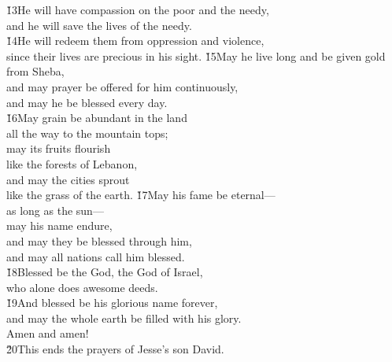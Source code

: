 \begin{poetry}
\poeml \v{13}He will have compassion on the poor and the needy, \\
\poemll    and he will save the lives of the needy. \\
\poeml \v{14}He will redeem them from oppression and violence, \\
\poemll    since their lives are precious in his sight.
\poeml \v{15}May he live long and be given gold from Sheba, \\
\poemll    and may prayer be offered for him continuously, \\
\poemlll       and may he be blessed every day. \\
\poeml \v{16}May grain be abundant in the land \\
\poemll    all the way to the mountain tops; \\
\poeml may its fruits flourish \\
\poemll    like the forests of Lebanon, \\
\poeml and may the cities sprout \\
\poemll    like the grass of the earth.
\poeml \v{17}May his fame be eternal--- \\
\poemll    as long as the sun--- \\
\poeml may his name endure, \\
\poemll    and may they be blessed through him, \\
\poemlll       and may all nations call him blessed. \\
\poeml \v{18}Blessed be the  God, the God of Israel, \\
\poemll    who alone does awesome deeds. \\
\poeml \v{19}And blessed be his glorious name forever, \\
\poemll    and may the whole earth be filled with his glory. \\
\poemlll       Amen and amen! \\
\poeml \v{20}This ends the prayers of Jesse's son David.
\end{poetry}

